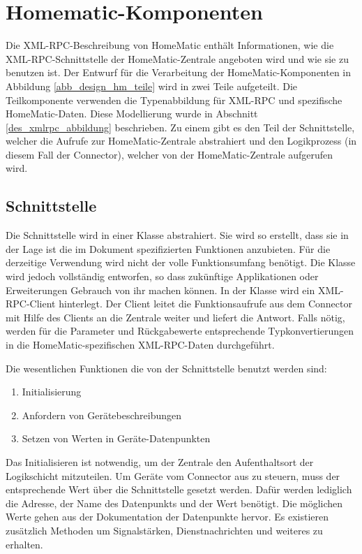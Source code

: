 \section{Homematic-Komponenten}
\label{des_homematic}


Die XML-RPC-Beschreibung von HomeMatic \cite{homematic_xmlrpc} enthält Informationen, wie die
XML-RPC-Schnittstelle der HomeMatic-Zentrale angeboten wird und wie sie zu benutzen ist.
Der Entwurf für die Verarbeitung der HomeMatic-Komponenten in Abbildung \ref{abb_design_hm_teile}
wird in zwei Teile aufgeteilt.
Die Teilkomponente verwenden die Typenabbildung für XML-RPC und spezifische HomeMatic-Daten.
Diese Modellierung wurde in Abschnitt \ref{des_xmlrpc_abbildung} beschrieben.
Zu einem gibt es den Teil der Schnittstelle, welcher die Aufrufe zur HomeMatic-Zentrale abstrahiert
und den Logikprozess (in diesem Fall der Connector), welcher von der HomeMatic-Zentrale aufgerufen wird.

\subsection{Schnittstelle}
\label{des_hm_iface}

Die Schnittstelle wird in einer Klasse abstrahiert.
Sie wird so erstellt, dass sie in der Lage ist die im Dokument spezifizierten Funktionen anzubieten.
Für die derzeitige Verwendung wird nicht der volle Funktionsumfang benötigt.
Die Klasse wird jedoch vollständig entworfen, so dass zukünftige Applikationen oder
Erweiterungen Gebrauch von ihr machen können.
In der Klasse wird ein XML-RPC-Client hinterlegt.
Der Client leitet die Funktionsaufrufe aus dem Connector mit Hilfe des Clients an die
Zentrale weiter und liefert die Antwort.
Falls nötig, werden für die Parameter und Rückgabewerte entsprechende Typkonvertierungen in die
HomeMatic-spezifischen XML-RPC-Daten durchgeführt.

Die wesentlichen Funktionen die von der Schnittstelle benutzt werden sind:
\begin{enumerate}
\item Initialisierung
\item Anfordern von Gerätebeschreibungen
\item Setzen von Werten in Geräte-Datenpunkten
\end{enumerate}
Das Initialisieren ist notwendig, um der Zentrale den Aufenthaltsort der Logikschicht
mitzuteilen.
Um Geräte vom Connector aus zu steuern, muss der entsprechende Wert über die Schnittstelle
gesetzt werden.
Dafür werden lediglich die Adresse, der Name des Datenpunkts und der Wert benötigt.
Die möglichen Werte gehen aus der Dokumentation der Datenpunkte hervor.
Es existieren zusätzlich Methoden um Signalstärken, Dienstnachrichten und weiteres
zu erhalten.

